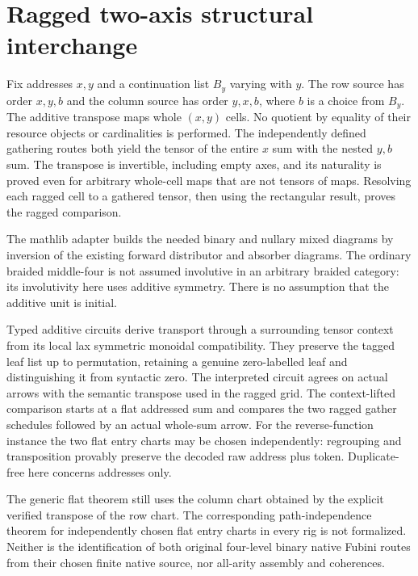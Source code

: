 \documentclass{article}
\begin{document}
\section*{Ragged two-axis structural interchange}
Fix addresses $x,y$ and a continuation list $B_y$ varying with $y$. The
row source has order $x,y,b$ and the column source has order $y,x,b$,
where $b$ is a choice from $B_y$. The additive transpose maps whole
$(x,y)$ cells. No quotient by equality of their resource objects or
cardinalities is performed. The independently defined gathering routes
both yield the tensor of the entire $x$ sum with the nested $y,b$
sum. The transpose is invertible, including empty axes, and its
naturality is proved even for arbitrary whole-cell maps that are not
tensors of maps. Resolving each ragged cell to a gathered tensor, then
using the rectangular result, proves the ragged comparison.

The mathlib adapter builds the needed binary and nullary mixed diagrams
by inversion of the existing forward distributor and absorber diagrams.
The ordinary braided middle-four is not assumed involutive in an
arbitrary braided category: its involutivity here uses additive symmetry.
There is no assumption that the additive unit is initial.

Typed additive circuits derive transport through a surrounding tensor
context from its local lax symmetric monoidal compatibility. They
preserve the tagged leaf list up to permutation, retaining a genuine
zero-labelled leaf and distinguishing it from syntactic zero.
The interpreted circuit agrees on actual arrows with the semantic
transpose used in the ragged grid. The context-lifted comparison starts
at a flat addressed sum and compares the two ragged gather schedules
followed by an actual whole-sum arrow. For the reverse-function
instance the two flat entry charts may be chosen independently:
regrouping and transposition provably preserve the decoded raw
address plus token. Duplicate-free here concerns addresses only.

The generic flat theorem still uses the column chart obtained by the
explicit verified transpose of the row chart. The corresponding
path-independence theorem for independently chosen flat entry
charts in every rig is not formalized. Neither is the identification
of both original four-level binary native Fubini routes from their
chosen finite native source, nor all-arity assembly and coherences.
\end{document}
